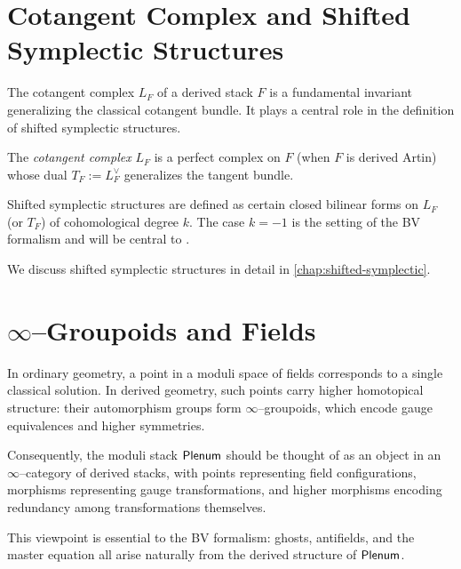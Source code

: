 \section{Cotangent Complex and Shifted Symplectic Structures}

The cotangent complex $L_F$ of a derived stack $F$ is a fundamental invariant
generalizing the classical cotangent bundle. It plays a central role in the
definition of shifted symplectic structures.

\begin{definition}
The \emph{cotangent complex} $L_F$ is a perfect complex on $F$ (when $F$ is
derived Artin) whose dual $T_F := L_F^\vee$ generalizes the tangent bundle.
\end{definition}

Shifted symplectic structures are defined as certain closed bilinear forms on
$L_F$ (or $T_F$) of cohomological degree $k$. The case $k=-1$ is the setting of
the BV formalism and will be central to \rsvpabbr{}.

We discuss shifted symplectic structures in detail in
\cref{chap:shifted-symplectic}.

\section{\texorpdfstring{$\infty$}{Infinity}--Groupoids and Fields}

In ordinary geometry, a point in a moduli space of fields corresponds to a
single classical solution. In derived geometry, such points carry higher
homotopical structure: their automorphism groups form $\infty$--groupoids,
which encode gauge equivalences and higher symmetries.

Consequently, the moduli stack $\mathsf{Plenum}$ should be thought of as an object in
an $\infty$--category of derived stacks, with points representing field
configurations, morphisms representing gauge transformations, and higher
morphisms encoding redundancy among transformations themselves.

This viewpoint is essential to the BV formalism: ghosts, antifields, and the
master equation all arise naturally from the derived structure of $\mathsf{Plenum}$.

